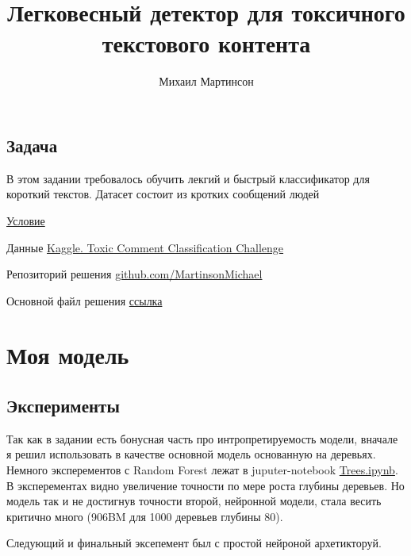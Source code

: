 \documentclass[11pt,a4paper]{article}
\title{Легковесный детектор для токсичного текстового контента}
\author{Михаил Мартинсон}
\theoremstyle{remark}
\begin{document}
	\maketitle
	
	\label{firstpage}
	
	\subsection*{Задача}
	
	В этом задании требовалось обучить лекгий и быстрый классификатор для короткий текстов. Датасет состоит из кротких сообщений людей
	
	
	\href{https://github.com/MartinsonMichael/VK_Lab_intro/blob/master/%D0%9F%D1%80%D0%B8%D0%BA%D0%BB%D0%B0%D0%B4%D0%BD%D1%8B%D0%B5%20%D0%B8%D1%81%D1%81%D0%BB%D0%B5%D0%B4%D0%BE%D0%B2%D0%B0%D0%BD%D0%B8%D1%8F%20.pdf}{Условие}
		
	Данные \href{https://www.kaggle.com/c/jigsaw-toxic-comment-classification-challenge/overview}{Kaggle. Toxic Comment Classification Challenge}
	
	Репозиторий решения \href{https://github.com/MartinsonMichael/VK_Lab_intro}{github.com/MartinsonMichael}
		
	Основной файл решения \href{https://github.com/MartinsonMichael/VK_Lab_intro/blob/master/nn_model_simple_rnn.ipynb}{ссылка}

	
	
	\section{Моя модель}
	
	\subsection*{Эксперименты}
	
	Так как в задании есть бонусная часть про интропретируемость модели, вначале я решил использовать в качестве основной модель основанную на деревьях. Немного эксперементов с Random Forest лежат в juputer-notebook
	\href{https://github.com/MartinsonMichael/VK_Lab_intro/blob/master/Trees.ipynb}{Trees.ipynb}. В эксперементах видно увеличение точности по мере роста глубины деревьев. Но модель так и не достигнув точности второй, нейронной модели, стала весить критично много (906BM для 1000 деревьев глубины 80).
	
	
	Следующий и финальный эксепемент был с простой нейроной архетикторуй.
	
\end{document}
